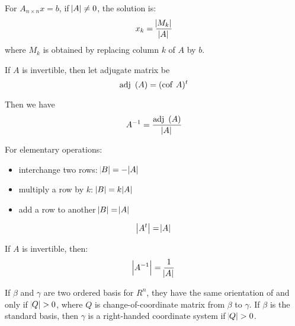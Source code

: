 \begin{theorem}
    For $A_{n \times n}x=b$, if $\abs{A} \neq 0$, the solution is:
    \begin{equation}
        x_k = \frac{\abs{M_k}}{\abs{A}}
    \end{equation}
    where $M_k$ is obtained by replacing column $k$ of $A$ by $b$.
\end{theorem}

\begin{theorem}
    If $A$ is invertible, then let adjugate matrix be
    \begin{equation}
        \displaystyle \mathrm{adj}~\left( A \right) = (\displaystyle \mathrm{cof}~\displaystyle A)^t
    \end{equation}
    
    Then we have
    \begin{equation}
        {A}^{-1} = \frac{\displaystyle \mathrm{adj}~\left( A \right)}{\abs{A}}
    \end{equation}    
\end{theorem}


\begin{theorem}
  For elementary operations:
\begin{itemize}
    \item interchange two rows: $\abs{B} = - \abs{A}$ 
    \item multiply a row by $k$: $\abs{B} = k \abs{A}$
    \item add a row to another $\abs{B} = \abs{A}$
\end{itemize}  
\end{theorem}

\begin{theorem}
    \begin{equation}
        \abs{A^t} = \abs{A}
    \end{equation}    
\end{theorem}

\begin{theorem}
    If $A$ is invertible, then:
    \begin{equation}
        \abs{{A}^{-1}} = \frac{1}{\abs{A}}
    \end{equation}    
\end{theorem}




\begin{definition}
    If $\beta$ and $\gamma$ are two ordered basis for $R^n$, they have the same orientation of and only if $\abs{Q} > 0$, where $Q$ is change-of-coordinate matrix from $\beta$ to $\gamma$. If $\beta$ is the standard basis, then $\gamma$ is a right-handed coordinate system if $\abs{Q} > 0$.
\end{definition}


